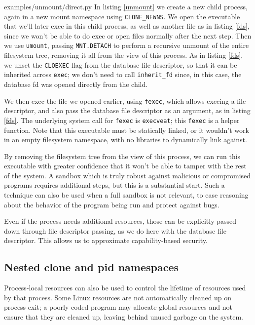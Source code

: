 \documentclass[letterpaper,twocolumn,10pt]{article}
\begin{document}

{examples/unmount/direct.py}
In listing \ref{unmount}
we create a new child process,
again in a new mount namespace using \verb|CLONE_NEWNS|.
We open the executable that we'll later exec in this child process,
as well as another file as in listing \ref{fds},
since we won't be able to do exec or open files normally after the next step.
Then we use \texttt{umount},
passing \texttt{MNT.DETACH} to perform a recursive unmount of the entire filesystem tree,
removing it all from the view of this process.
As in listing \ref{fds}, we unset the \texttt{CLOEXEC} flag from the database file descriptor,
so that it can be inherited across \texttt{exec};
we don't need to call \verb|inherit_fd| since, in this case, the database fd was opened directly from the child.

We then exec the file we opened earlier, using \texttt{fexec},
which allows execing a file descriptor,
and also pass the database file descriptor as an argument,
as in listing \ref{fds}.
The underlying system call for \texttt{fexec} is \texttt{execveat};
this \texttt{fexec} is a helper function.\cite{execveat}
Note that this executable must be statically linked,
or it wouldn't work in an empty filesystem namespace,
with no libraries to dynamically link against.

By removing the filesystem tree from the view of this process,
we can run this executable with greater confidence
that it won't be able to tamper with the rest of the system.
A sandbox which is truly robust against malicious or compromised programs requires additional steps,
but this is a substantial start.\cite{firejail}\cite{gvisor}
Such a technique can also be used when a full sandbox is not relevant,
to ease reasoning about the behavior of the program being run
and protect against bugs.

Even if the process needs additional resources,
those can be explicitly passed down through file descriptor passing,
as we do here with the database file descriptor.
This allows us to approximate capability-based security.\cite{capsicum}
\subsection{Nested clone and pid namespaces}
Process-local resources can also be used to control the lifetime of resources used by that process.
Some Linux resources are not automatically cleaned up on process exit;
a poorly coded program may allocate global resources
and not ensure that they are cleaned up,
leaving behind unused garbage on the system.
\end{document}
